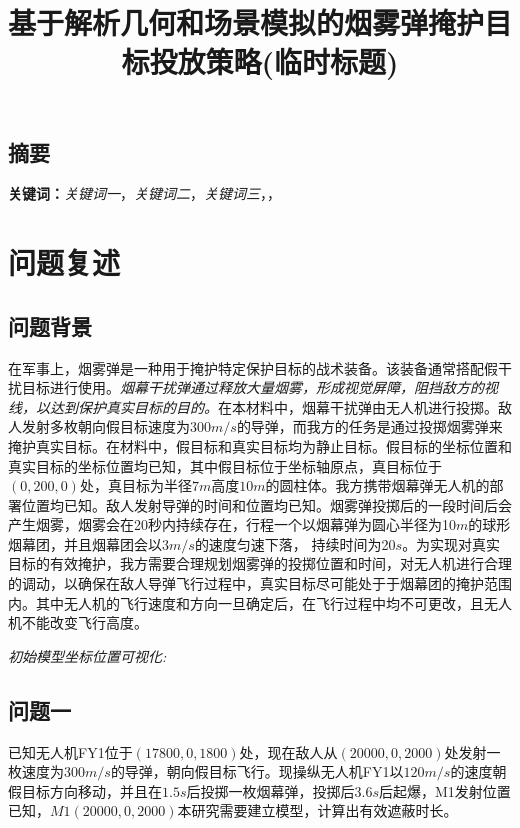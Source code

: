 \documentclass{article}
\title{\large 基于解析几何和场景模拟的烟雾弹掩护目标投放策略(临时标题)}
\date{}
\begin{document}
\maketitle
\begin{center}
\section*{摘要}
\end{center}
\vspace{-1em}


\noindent


\noindent
\textbf{关键词：}\textit{关键词一}，\textit{关键词二}，\textit{关键词三}，\textit{}，\textit{}



\section{问题复述}

\subsection{问题背景}

在军事上，烟雾弹是一种用于掩护特定保护目标的战术装备。该装备通常搭配假干扰目标进行使用。\textit{烟幕干扰弹通过释放大量烟雾，形成视觉屏障，阻挡敌方的视线，以达到保护真实目标的目的。}在本材料中，烟幕干扰弹由无人机进行投掷。敌人发射多枚朝向假目标速度为$300m/s$的导弹，而我方的任务是通过投掷烟雾弹来掩护真实目标。在材料中，假目标和真实目标均为静止目标。假目标的坐标位置和真实目标的坐标位置均已知，其中假目标位于坐标轴原点，真目标位于$(0,200,0)$处，真目标为半径$7m$高度$10m$的圆柱体。我方携带烟幕弹无人机的部署位置均已知。敌人发射导弹的时间和位置均已知。烟雾弹投掷后的一段时间后会产生烟雾，烟雾会在20秒内持续存在，行程一个以烟幕弹为圆心半径为10$m$的球形烟幕团，并且烟幕团会以$3 m/s$的速度匀速下落，
持续时间为20$s$。为实现对真实目标的有效掩护，我方需要合理规划烟雾弹的投掷位置和时间，对无人机进行合理的调动，以确保在敌人导弹飞行过程中，真实目标尽可能处于于烟幕团的掩护范围内。其中无人机的飞行速度和方向一旦确定后，在飞行过程中均不可更改，且无人机不能改变飞行高度。

\textit{初始模型坐标位置可视化:}

\subsection{问题一}

已知无人机FY1位于$(17800,0,1800)$处，现在敌人从$(20000,0,2000)$处发射一枚速度为$300m/s$的导弹，朝向假目标飞行。现操纵无人机FY1以$120m/s$的速度朝假目标方向移动，并且在$1.5s$后投掷一枚烟幕弹，投掷后$3.6s$后起爆，M1发射位置已知，$M1(20000,0,2000)$本研究需要建立模型，计算出有效遮蔽时长。
\end{document}
